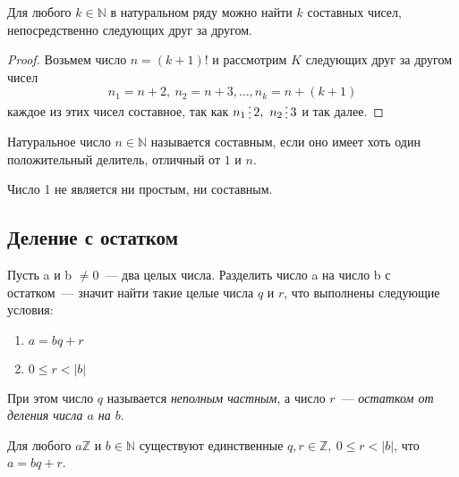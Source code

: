 \documentclass[11pt]{article}
\begin{document}
\begin{theorem}
	Для любого $k \in \mathbb{N}$ в натуральном ряду можно найти $k$ составных чисел, непосредственно следующих друг за другом.
\end{theorem}
\begin{proof}
	Возьмем число $n = (k + 1)!$ и рассмотрим $K$ следующих друг за другом чисел
	\[ n_1 = n + 2, \ n_2 = n + 3, \ldots, n_k = n + (k + 1) \]
	каждое из этих чисел составное, так как $n_1 \divisible 2, \ n_2 \divisible 3$ и так далее.
\end{proof}

\begin{definition}

	Натуральное число $n \in \mathbb{N}$ называется составным, если оно имеет хоть один положительный делитель, отличный от $1$ и $n$.

\end{definition}

\begin{remark}

	Число 1 не является ни простым, ни составным.

\end{remark}

\subsection{Деление с остатком}

\begin{definition}
    Пусть a и b $\neq 0$~--- два целых числа. Разделить число  a на число b с остатком~--- значит найти такие целые числа $q$ и $r$, что выполнены следующие условия:

	\begin{enumerate}

	    \item $a = bq + r$

		\item $0 \le r < |b|$

	\end{enumerate}

	При этом число $q$ называется \emph{неполным частным}, а число $r$~--- \emph{остатком от деления числа $a$ на $b$}.

\end{definition}

\begin{theorem}

    Для любого $a \mathbb{Z}$ и $b \in \mathbb{N}$ существуют единственные $q, r \in \mathbb{Z}, \ 0 \le r < |b|$, что $a = bq + r$.

\end{theorem}
\end{document}
